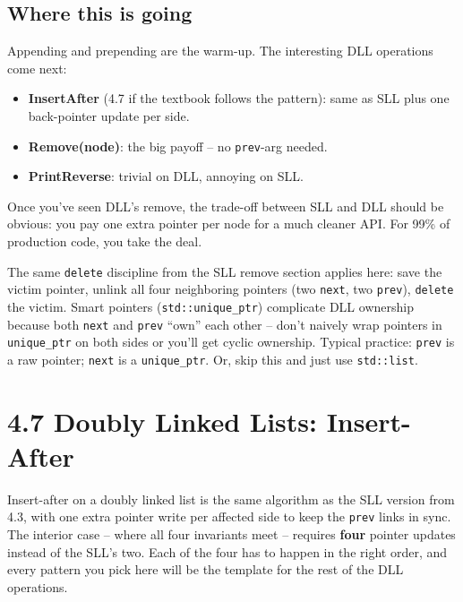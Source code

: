 \documentclass[11pt]{article}
\begin{document}
\subsection{Where this is going}

\begin{ideabox}
Appending and prepending are the warm-up. The interesting DLL
operations come next:
\begin{itemize}[leftmargin=*]
  \item \textbf{InsertAfter} (4.7 if the textbook follows the
        pattern): same as SLL plus one back-pointer update per side.
  \item \textbf{Remove(node)}: the big payoff -- no
        \texttt{prev}-arg needed.
  \item \textbf{PrintReverse}: trivial on DLL, annoying on SLL.
\end{itemize}
Once you've seen DLL's remove, the trade-off between SLL and DLL
should be obvious: you pay one extra pointer per node for a much
cleaner API. For 99\% of production code, you take the deal.
\end{ideabox}

\begin{warnbox}
The same \texttt{delete} discipline from the SLL remove section
applies here: save the victim pointer, unlink all four
neighboring pointers (two \texttt{next}, two \texttt{prev}),
\texttt{delete} the victim. Smart pointers (\texttt{std::unique\_ptr})
complicate DLL ownership because both \texttt{next} and \texttt{prev}
``own'' each other -- don't naively wrap pointers in
\texttt{unique\_ptr} on both sides or you'll get cyclic ownership.
Typical practice: \texttt{prev} is a raw pointer; \texttt{next}
is a \texttt{unique\_ptr}. Or, skip this and just use
\texttt{std::list}.
\end{warnbox}

\section{4.7 Doubly Linked Lists: Insert-After}

Insert-after on a doubly linked list is the same algorithm as the
SLL version from 4.3, with one extra pointer write per affected
side to keep the \texttt{prev} links in sync. The interior case --
where all four invariants meet -- requires \textbf{four} pointer
updates instead of the SLL's two. Each of the four has to happen in
the right order, and every pattern you pick here will be the
template for the rest of the DLL operations.
\end{document}
